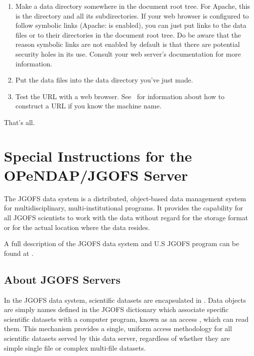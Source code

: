 \documentclass{dods-book}
\begin{document}
\begin{enumerate}
\item Make a data directory somewhere in the document root tree.  For
  Apache, this is the  directory and all its
  subdirectories.  If your web browser is configured to follow
  symbolic links (Apache:  is enabled), you can
  just put links to the data files or to their directories in the
  document root tree.  Do be aware that the reason symbolic links are
  not enabled by default is that there are potential security holes in
  its use.  Consult your web server's documentation for more
  information. 

\item Put the data files into the data directory you've just made.


\item Test the URL with a web browser.  See \DODSquick\ for
  information about how to construct a URL if you know the machine name.

\end{enumerate}

That's all.


\section{Special Instructions for the OPeNDAP/JGOFS Server}

The JGOFS data system is a distributed, object-based data management
system for multidisciplinary, multi-institutional programs. It
provides the capability for all JGOFS scientists to work with the data
without regard for the storage format or for the actual location where
the data resides.

A full description of the JGOFS data system and U.S JGOFS program can
be found at .

\subsection{About JGOFS Servers}

In the JGOFS data system, scientific datasets are encapsulated in
.  Data objects are simply names defined in the
JGOFS  dictionary which associate specific scientific
datasets with a computer program, known as an access ,
which can   read them.
This mechanism provides a single, uniform access methodology for all
scientific datasets served by this data server, regardless of whether
they are simple single file or complex multi-file datasets.
\end{document}
